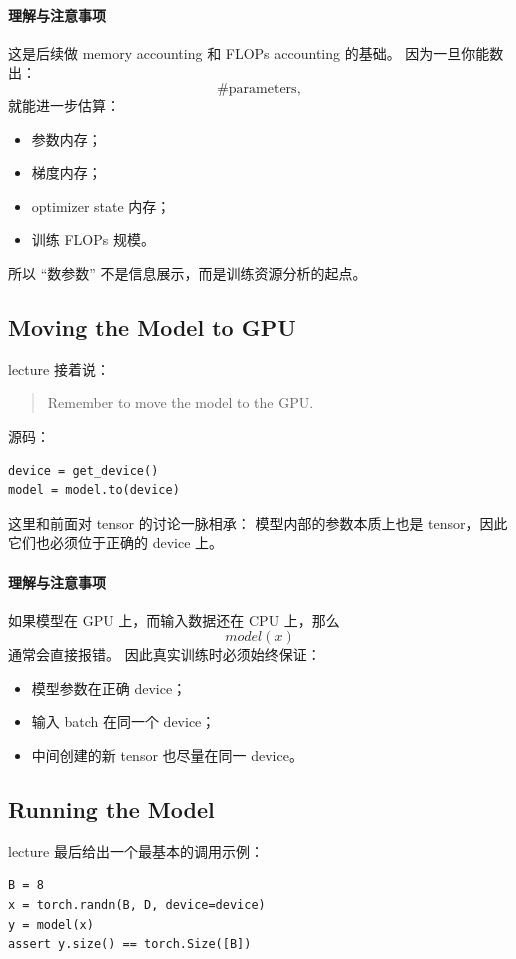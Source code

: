 \documentclass[a4paper,UTF8]{article}
\numberwithin{equation}{section}
\begin{document}
\paragraph{理解与注意事项}
这是后续做 memory accounting 和 FLOPs accounting 的基础。  
因为一旦你能数出：
\[
\#\text{parameters},
\]
就能进一步估算：
\begin{itemize}
    \item 参数内存；
    \item 梯度内存；
    \item optimizer state 内存；
    \item 训练 FLOPs 规模。
\end{itemize}

所以 ``数参数'' 不是信息展示，而是训练资源分析的起点。

\subsection{Moving the Model to GPU}

lecture 接着说：
\begin{quote}
Remember to move the model to the GPU.
\end{quote}

源码：
\begin{verbatim}
device = get_device()
model = model.to(device)
\end{verbatim}

这里和前面对 tensor 的讨论一脉相承：  
模型内部的参数本质上也是 tensor，因此它们也必须位于正确的 device 上。

\paragraph{理解与注意事项}
如果模型在 GPU 上，而输入数据还在 CPU 上，那么
\[
model(x)
\]
通常会直接报错。  
因此真实训练时必须始终保证：
\begin{itemize}
    \item 模型参数在正确 device；
    \item 输入 batch 在同一个 device；
    \item 中间创建的新 tensor 也尽量在同一 device。
\end{itemize}

\subsection{Running the Model}

lecture 最后给出一个最基本的调用示例：
\begin{verbatim}
B = 8
x = torch.randn(B, D, device=device)
y = model(x)
assert y.size() == torch.Size([B])
\end{verbatim}
\end{document}

